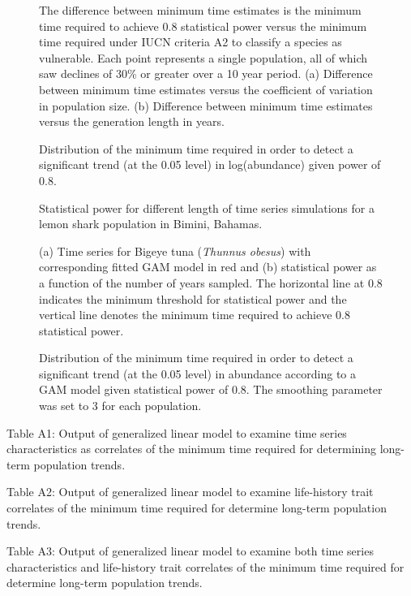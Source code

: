 \documentclass[12pt,]{article}
\begin{document}
\begin{figure}[htbp]
\centering
\caption{The difference between minimum time estimates is the minimum time required to achieve 0.8 statistical power versus the minimum time required under IUCN criteria A2 to classify a species as vulnerable. Each point represents a single population, all of which saw declines of 30\% or greater over a 10 year period. (a) Difference between minimum time estimates versus the coefficient of variation in population size. (b) Difference between minimum time estimates versus the generation length in years.\label{fig:IUCN_correlates}}
\end{figure}

\begin{figure}[htbp]
\centering
\caption{Distribution of the minimum time required in order to detect a
significant trend (at the 0.05 level) in log(abundance) given power of
0.8.\label{fig:min_time_dist_log_pop}}
\end{figure}

\begin{figure}[htbp]
\centering
\caption{Statistical power for different length of time series
simulations for a lemon shark population in Bimini,
Bahamas.\label{fig:shark_example}}
\end{figure}

\begin{figure}[htbp]
\centering
\caption{(a) Time series for Bigeye tuna (\emph{Thunnus obesus}) with
corresponding fitted GAM model in red and (b) statistical power as a
function of the number of years sampled. The horizontal line at 0.8
indicates the minimum threshold for statistical power and the vertical
line denotes the minimum time required to achieve 0.8 statistical
power.\label{fig:gam_example}}
\end{figure}

\begin{figure}[htbp]
\centering
\caption{Distribution of the minimum time required in order to detect a
significant trend (at the 0.05 level) in abundance according to a GAM
model given statistical power of 0.8. The smoothing parameter was set to
3 for each population.\label{fig:min_time_dist_gam}}
\end{figure}

\vspace{1 cm}

Table A1: Output of generalized linear model to examine time series
characteristics as correlates of the minimum time required for
determining long-term population trends.

\vspace{1 cm}

Table A2: Output of generalized linear model to examine life-history
trait correlates of the minimum time required for determine long-term
population trends.

\vspace{1 cm}

Table A3: Output of generalized linear model to examine both time series
characteristics and life-history trait correlates of the minimum time
required for determine long-term population trends.
\end{document}

